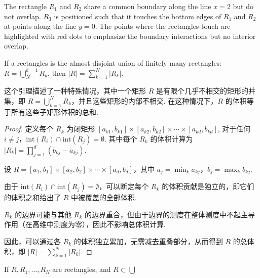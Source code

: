 \documentclass[UTF8,12pt,AutoFakeBold]{ctexbook}
\numberwithin{equation}{section}
\begin{document}
	\begin{figure}[H]
		\centering
	\end{figure}
	The rectangle $R_1$ and $R_2$ share a common boundary along the line $x=2$ but do not overlap. $R_3$ is positioned such that it touches the bottom edges of $R_1$ and $R_2$ at points along the line $y=0$. The points where the rectangles touch are highlighted with red dots to emphasize the boundary interactions but no interior overlap.
	\begin{lemma}
		If a rectangles is the almost disjoint union of finitely many rectangles: $R=\bigcup_{N}^{k=1} R_k $, then $\left | R \right |=\sum_{k=1}^{N}\left | R_k \right |$.
	\end{lemma}
	这个引理描述了一种特殊情况，其中一个矩形 \( R \) 是有限个几乎不相交的矩形的并集，即 \( R=\bigcup_{k=1}^N R_k \)，并且这些矩形的内部不相交. 在这种情况下，\( R \) 的体积等于所有这些子矩形体积的总和.
	\begin{proof}
		定义每个 \( R_k \) 为闭矩形 \([a_{k1}, b_{k1}] \times [a_{k2}, b_{k2}] \times \cdots \times [a_{kd}, b_{kd}]\), 对于任何 \( i \neq j \)，\( \text{int}(R_i) \cap \text{int}(R_j) = \emptyset \). 其中每个 \( R_k \) 的体积计算为 \( |R_k| = \prod_{j=1}^d (b_{kj} - a_{kj}) \).
		
		设 \( R = [a_1, b_1] \times [a_2, b_2] \times \cdots \times [a_d, b_d] \)，其中 \( a_j = \min_k a_{kj} \)，\( b_j = \max_k b_{kj} \).
		
		由于 \( \text{int}(R_i) \cap \text{int}(R_j) = \emptyset \)，可以断定每个 \( R_k \) 的体积贡献是独立的，即它们的体积之和给出了 \( R \) 中被覆盖的全部体积.
		
		\( R_k \) 的边界可能与其他 \( R_k \) 的边界重合，但由于边界的测度在整体测度中不起主导作用（在高维中测度为零），因此不影响总体积计算.
		
		因此，可以通过各 \( R_k \) 的体积独立累加，无需减去重叠部分，从而得到 \( R \) 的总体积，即 \( |R| = \sum_{k=1}^N |R_k| \).
	\end{proof}
	
	\begin{lemma}
		If $R, R_1,\dots, R_N$ are rectangles, and $R \subset \bigcup_{}^{}$
		
	\end{lemma}
	
	
\end{document}
